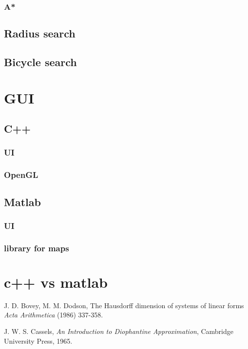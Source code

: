 \documentclass[reqno,openany,12pt]{amsbook}
\theoremstyle{definition}
\theoremstyle{remark}
\begin{document}
\subsection{A*}
\section{Radius search}
\section{Bicycle search}
\chapter{GUI}
\section{C++}
\subsection{UI}
\subsection{OpenGL}
\section{Matlab}
\subsection{UI}
\subsection{library for maps}
\chapter{c++ vs matlab}




\begin{thebibliography}{99}

J. D. Bovey, M. M. Dodson,
The Hausdorff dimension of systems of linear forms
{\em Acta Arithmetica}
(1986) 337-358.

J. W. S. Cassels,
{\em An Introduction to Diophantine Approximation},
Cambridge University Press, 1965.



\end{thebibliography}
\end{document}
